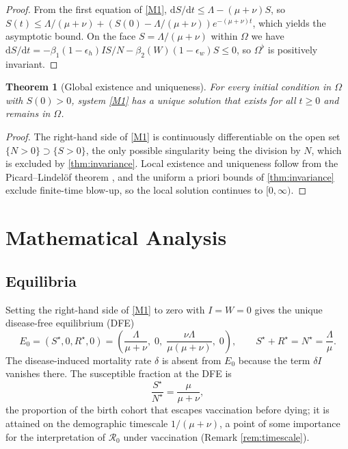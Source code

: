 \documentclass[11pt]{article}
\theoremstyle{plain}
\newtheorem{theorem}{Theorem}[section]
\theoremstyle{definition}
\theoremstyle{remark}
\newcommand{\Rz}{\mathcal{R}_0}
\newcommand{\dd}{\mathrm{d}}
\begin{document}
\begin{proof}
From the first equation of \eqref{M1}, $\dd S/\dd t\le\Lambda-(\mu+\nu)S$, so $S(t)\le \Lambda/(\mu+\nu)+(S(0)-\Lambda/(\mu+\nu))e^{-(\mu+\nu)t}$, which yields the asymptotic bound. On the face $S=\Lambda/(\mu+\nu)$ within $\Omega$ we have $\dd S/\dd t=-\beta_1(1-\epsilon_h)IS/N-\beta_2(W)(1-\epsilon_w)S\le0$, so $\Omega^\flat$ is positively invariant.
\end{proof}

\begin{theorem}[Global existence and uniqueness]\label{thm:global}
For every initial condition in $\Omega$ with $S(0)>0$, system \eqref{M1} has a unique solution that exists for all $t\ge0$ and remains in $\Omega$.
\end{theorem}

\begin{proof}
The right-hand side of \eqref{M1} is continuously differentiable on the open set $\{N>0\}\supset\{S>0\}$, the only possible singularity being the division by $N$, which is excluded by \cref{thm:invariance}. Local existence and uniqueness follow from the Picard--Lindel\"of theorem \cite{Coddington1955}, and the uniform a priori bounds of \cref{thm:invariance} exclude finite-time blow-up, so the local solution continues to $[0,\infty)$.
\end{proof}

\section{Mathematical Analysis}\label{sec3}

\subsection{Equilibria}\label{subsec:equilibria}

Setting the right-hand side of \eqref{M1} to zero with $I=W=0$ gives the unique disease-free equilibrium (DFE)
\begin{equation}\label{eq:DFE}
E_0=(S^\star,0,R^\star,0)=\left(\frac{\Lambda}{\mu+\nu},\;0,\;\frac{\nu\Lambda}{\mu(\mu+\nu)},\;0\right),
\qquad S^\star+R^\star=N^\star=\frac{\Lambda}{\mu}.
\end{equation}
The disease-induced mortality rate $\delta$ is absent from $E_0$ because the term $\delta I$ vanishes there. The susceptible fraction at the DFE is
\begin{equation}\label{eq:susfrac}
\frac{S^\star}{N^\star}=\frac{\mu}{\mu+\nu},
\end{equation}
the proportion of the birth cohort that escapes vaccination before dying; it is attained on the demographic timescale $1/(\mu+\nu)$, a point of some importance for the interpretation of $\Rz$ under vaccination (Remark \ref{rem:timescale}).
\end{document}
